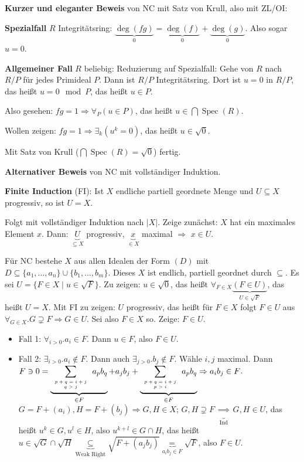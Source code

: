 \documentclass[headsepline=true,DIV=11]{scrartcl}
\theoremstyle{definition}
\newcommand{\Spec}{\operatorname{Spec}}
\begin{document}
{\bf Kurzer und eleganter Beweis} von NC mit Satz von Krull, also mit ZL/OI:

{\bf Spezialfall} $R$ Integritätsring: $\underbrace{\deg(fg)}_0=\underbrace{\deg(f)}_0+\underbrace{\deg(g)}_0$. Also sogar $u=0$.

{\bf Allgemeiner Fall} $R$ beliebig: Reduzierung auf Spezialfall: Gehe von $R$ nach $R/P$ für jedes Primideal $P$. Dann ist $R/P$
Integritätsring. Dort ist $u=0$ in $R/P$, das heißt $u=0 \mod P$, das heißt $u\in P$.

Also gesehen: $fg=1\Rightarrow\forall_P(u\in P)$, das heißt $u\in\bigcap\Spec(R)$.

Wollen zeigen: $fg=1\Rightarrow\exists_k(u^k=0)$, das heißt $u\in\sqrt{0}$.

Mit Satz von Krull ($\bigcap\Spec(R)=\sqrt{0}$) fertig.

{\bf Alternativer Beweis} von NC mit vollständiger Induktion.

{\bf Finite Induction} (FI): Ist $X$ endliche partiell geordnete Menge und $U\subseteq X$ progressiv, so ist $U=X$.

Folgt mit vollständiger Induktion nach $|X|$. Zeige zunächst: $X$ hat ein maximales Element $x$. Dann: $\underbrace{U}_{\subseteq X}$ progressiv,
$\underbrace{x}_{\in X}$ maximal $\Rightarrow$ $x\in U$.

Für NC bestehe $X$ aus allen Idealen der Form $(D)$ mit $D\subseteq\{a_1,\ldots,a_n\}\cup\{b_1,\ldots,b_m\}$. Dieses $X$ ist endlich, partiell
geordnet durch $\subseteq$. Es sei $U=\{F\in X\mid u\in\sqrt{F}\}$. Zu zeigen: $u\in\sqrt{0}$, das heißt $\forall_{F\in X}\underbrace{(F\in
  U)}_{U\in\sqrt{F}}$, das heißt $U=X$. Mit FI zu zeigen: $U$ progressiv, das heißt für $F\in X$ folgt $F\in U$ aus $\forall_{G\in X}.G\supsetneq
F\Rightarrow G\in U$. Sei also $F\in X$ so. Zeige: $F\in U$.
\begin{itemize}
\item Fall 1: $\forall_{i>0}.a_i\in F$. Dann $u\in F$, also $F\in U$.
\item Fall 2: $\exists_{i>0}.a_i\not\in F$. Dann auch $\exists_{j>0}.b_j\not\in F$. Wähle $i, j$ maximal. Dann $F\ni
  0=\underbrace{\sum\limits_{\tiny \begin{array}{c}p+q = i+j\\ q>j\end{array}} a_pb_q}_{\in F} +
  a_jb_j+\underbrace{\sum\limits_{\tiny \begin{array}{c}p+q=i+j\\ p>i\end{array}} a_pb_q}_{\in F}\Rightarrow a_ib_j\in
  F$. $G=F+(a_i),H=F+(b_j)\Rightarrow G,H\in X$; $G,H\supsetneq F$ $\underbrace{\Rightarrow}_{\mbox{Ind}}$ $G,H\in U$, das heißt $u^k\in G, u^l\in H$,
  also $u^{k+l}\in G\cap H$, das heißt $u\in\sqrt{G}\cap\sqrt{H}\underbrace{\subseteq}_{\mbox{Weak Right}}\sqrt{F+(a_jb_j)}\underbrace{=}_{a_ib_j\in
    F}\sqrt{F}$, also $F\in U$.
\end{itemize}
\end{document}
